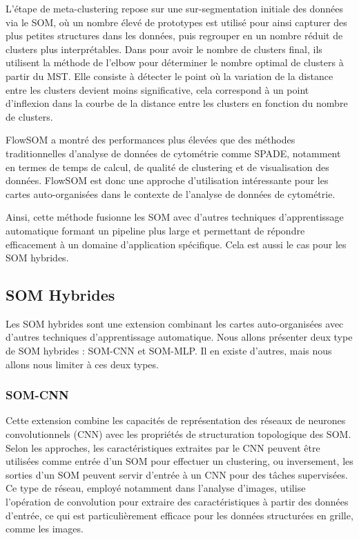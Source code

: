 \documentclass[12pt,a4paper]{report}
\begin{document}
L'étape de meta-clustering repose sur une sur-segmentation initiale des données via le SOM, où un nombre élevé de prototypes est utilisé pour ainsi capturer des plus petites structures dans les données, 
puis regrouper en un nombre réduit de clusters plus interprétables. Dans \cite{FlowSOM} pour avoir le nombre de clusters final, ils utilisent la méthode de l'elbow 
pour déterminer le nombre optimal de clusters à partir du MST. Elle consiste à détecter le point où la variation de la distance entre les clusters devient moins significative, 
cela correspond à un point d'inflexion dans la courbe de la distance entre les clusters en fonction du nombre de clusters.

FlowSOM a montré des performances plus élevées que des méthodes traditionnelles d'analyse de données de cytométrie comme SPADE, notamment en termes de temps de calcul, 
de qualité de clustering et de visualisation des données.
FlowSOM est donc une approche d'utilisation intéressante pour les cartes auto-organisées dans le contexte de l'analyse de données de cytométrie.

Ainsi, cette méthode fusionne les SOM avec d'autres techniques d'apprentissage automatique formant un pipeline plus large et permettant de répondre efficacement à un domaine d'application spécifique.
Cela est aussi le cas pour les SOM hybrides.

\subsection{SOM Hybrides}
Les SOM hybrides sont une extension combinant les cartes auto-organisées avec d'autres techniques d'apprentissage automatique.
Nous allons présenter deux type de SOM hybrides : SOM-CNN et SOM-MLP. Il en existe d'autres, mais nous allons nous limiter à ces deux types.

\subsubsection{SOM-CNN}
Cette extension combine les capacités de représentation des réseaux de neurones convolutionnels (CNN) avec les propriétés de structuration topologique des SOM.
Selon les approches, les caractéristiques extraites par le CNN peuvent être utilisées comme entrée d'un SOM pour effectuer un clustering, ou inversement, 
les sorties d'un SOM peuvent servir d'entrée à un CNN pour des tâches supervisées.
Ce type de réseau, employé notamment dans l'analyse d'images, utilise l'opération de convolution pour extraire des caractéristiques à partir des données d'entrée, ce qui est particulièrement 
efficace pour les données structurées en grille, comme les images.
\end{document}
